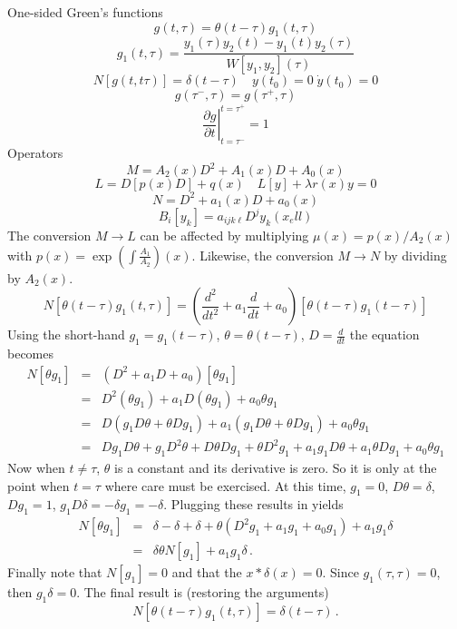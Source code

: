 One-sided Green's functions
\[
  g(t,\tau) = \theta(t-\tau) g_1(t,\tau)
\]
\[
  g_1(t,\tau) = \frac{ y_1(\tau) y_2(t) - y_1(t) y_2(\tau) }{ W[y_1,y_2](\tau) }
\]
\[
  N[g(t,t\tau)] = \delta(t-\tau) \quad y(t_0) = 0 \; {\dot y}(t_0) = 0 
\]
\[
  g(\tau^{-},\tau) = g(\tau^{+},\tau)
\]
\[
  \left. \frac{\partial g}{\partial t} \right|^{t=\tau^{+}}_{t=\tau^{-}} = 1
\]
Operators
\[
  M = A_2(x) D^2 + A_1(x) D + A_0(x)
\]
\[
  L = D[ p(x) D] + q(x) \quad L[y] + \lambda r(x) y = 0
\]
\[
  N = D^2 + a_1(x) D + a_0(x)
\]
\[
  B_i[y_k] = a_{ijk\ell} D^j y_k(x_ell)
\]
The conversion $M \rightarrow L$ can be affected by multiplying $\mu(x) = 
p(x)/A_2(x)$ with $p(x) = \exp\left( \int \frac{A_1}{A_2} \right)(x)$.  
Likewise, the conversion $M \rightarrow N$ by dividing by $A_2(x)$.
\[
  N[ \theta(t-\tau) g_1(t,\tau) ] =  \left( \frac{d^2}{d t^2} + a_1 \frac{d}{dt} + a_0 \right) 
                                     [\theta(t-\tau) g_1(t-\tau) ] 
\]
Using the short-hand $g_1 = g_1(t-\tau)$, $\theta = \theta(t-\tau)$, 
$D = \frac{d}{dt}$ the equation becomes
\begin{eqnarray*}
  N[\theta g_1] & = & (D^2 + a_1 D + a_0)[\theta g_1] \\
                & = & D^2(\theta g_1) + a_1 D(\theta g_1) + a_0 \theta g_1\\
                & = & D(g_1 D\theta + \theta D g_1) + a_1 (g_1 D \theta + \theta D g_1 ) + a_0 \theta g_1 \\
                & = & D g_1 D \theta + g_1 D^2 \theta + D\theta Dg_1 
                      + \theta D^2 g_1 + a_1 g_1 D\theta + a_1 \theta Dg_1 + a_0 \theta g_1
\end{eqnarray*}
Now when $t \neq \tau$, $\theta$ is a constant and its derivative is zero.
So it is only at the point when $t = \tau$ where care must be exercised. At 
this time, $g_1 = 0$, $D \theta = \delta$, $Dg_1 = 1$, $g_1 D\delta = -\delta g_1 = -\delta$.
Plugging these results in yields
\begin{eqnarray*}
  N[\theta g_1] & = &   \delta - \delta + \delta 
                      + \theta (D^2 g_1 + a_1 g_1 + a_0 g_1 ) + a_1 g_1 \delta \\
                & = & \delta \theta N[g_1] + a_1 g_1 \delta \, .
\end{eqnarray*}
Finally note that $N[g_1] = 0$ and that the $x*\delta(x) = 0$.  Since $g_1(\tau,\tau) = 0$, 
then $g_1 \delta = 0$.  The final result is (restoring the arguments)
\[
  N[\theta(t-\tau) g_1(t,\tau)] = \delta(t-\tau) \, .
\] 
 